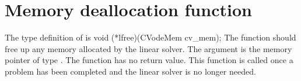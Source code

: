 
\section{Memory deallocation function}
The type definition of  is
{
  void (*lfree)(CVodeMem cv\_mem);
}
{
  The function  should free up any memory allocated by the linear
  solver.
}
{
  The argument  is the {\cvodes} memory pointer of type .
}
{
  The  function has no return value.
}
{
  This function is called once a problem has been completed and the 
  linear solver is no longer needed.
}
